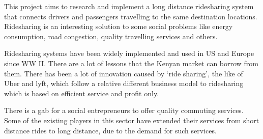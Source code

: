 This project aims to research and implement a long distance ridesharing system that connects drivers and passengers travelling to the same destination locations. Ridesharing is an interesting solution to some social problems like energy consumption, road congestion, quality travelling services and others. ~\cite{Noland2006}

Ridesharing systems have been widely implemented and used in US and Europe since WW II\@. There are a lot of lessons that the Kenyan market can borrow from them. There has been a lot of innovation caused by `ride sharing', the like of Uber and lyft, which follow a relative different business model to ridesharing which is based on efficient service and profit only.

There is a gab for a social entrepreneurs to offer quality commuting services. Some of the existing players in this sector have extended their services from short distance rides to long distance, due to the demand for such services.